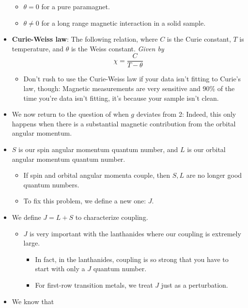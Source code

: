 \documentclass[../notes.tex]{subfiles}
\begin{document}
\begin{itemize}
    \begin{itemize}
        \item $\theta=0$ for a pure paramagnet.
        \item $\theta\neq 0$ for a long range magnetic interaction in a solid sample.
    \end{itemize}
    \item \textbf{Curie-Weiss law}: The following relation, where $C$ is the Curie constant, $T$ is temperature, and $\theta$ is the Weiss constant. \emph{Given by}
    \begin{equation*}
        \chi = \frac{C}{T-\theta}
    \end{equation*}
    \begin{itemize}
        \item Don't rush to use the Curie-Weiss law if your data isn't fitting to Curie's law, though: Magnetic measurements are very sensitive and 90\% of the time you're data isn't fitting, it's because your sample isn't clean.
    \end{itemize}
    \item We now return to the question of when $g$ deviates from 2: Indeed, this only happens when there is a substantial magnetic contribution from the orbital angular momentum.
    \item $S$ is our spin angular momentum quantum number, and $L$ is our orbital angular momentum quantum number.
    \begin{itemize}
        \item If spin and orbital angular momenta couple, then $S,L$ are no longer good quantum numbers.
        \item To fix this problem, we define a new one: $J$.
    \end{itemize}
    \item We define $J=L+S$ to characterize coupling.
    \begin{itemize}
        \item $J$ is very important with the lanthanides where our coupling is extremely large.
        \begin{itemize}
            \item In fact, in the lanthanides, coupling is so strong that you have to start with only a $J$ quantum number.
            \item For first-row transition metals, we treat $J$ just as a perturbation.
        \end{itemize}
    \end{itemize}
    \item We know that

\end{itemize}
\end{document}

